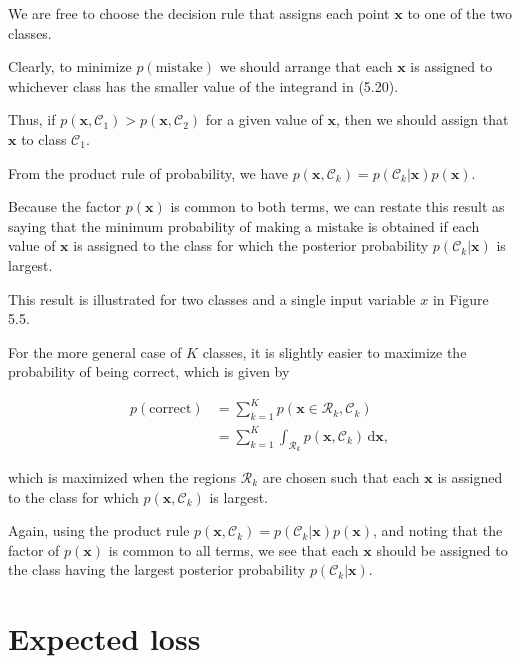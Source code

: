 \documentclass{article}
\begin{document}
We are free to choose the decision rule that assigns each point $\mathbf{x}$ to one of the two classes. 

Clearly, to minimize $p(\text{mistake})$ we should arrange that each $\mathbf{x}$ is assigned to whichever class has the smaller value of the integrand in (5.20). 

Thus, if $p(\mathbf{x},\mathcal{C}_{1}) > p(\mathbf{x},\mathcal{C}_{2})$ for a given value of $\mathbf{x}$, then we should assign that $\mathbf{x}$ to class $\mathcal{C}_{1}$. 

From the product rule of probability, we have $p(\mathbf{x},\mathcal{C}_{k}) = p(\mathcal{C}_{k}|\mathbf{x})p(\mathbf{x})$. 

Because the factor $p(\mathbf{x})$ is common to both terms, we can restate this result as saying that the minimum probability of making a mistake is obtained if each value of $\mathbf{x}$ is assigned to the class for which the posterior probability $p(\mathcal{C}_{k}|\mathbf{x})$ is largest. 

This result is illustrated for two classes and a single input variable $x$ in Figure 5.5.

For the more general case of $K$ classes, it is slightly easier to maximize the probability of being correct, which is given by

\begin{align}
p(\text{correct}) &= \sum_{k=1}^{K}p(\mathbf{x}\in\mathcal{R}_{k},\mathcal{C}_{k}) \\
&= \sum_{k=1}^{K}\int_{\mathcal{R}_{k}}p(\mathbf{x},\mathcal{C}_{k})\,\mathrm{d}\mathbf{x},
\tag{5.21}
\end{align}

which is maximized when the regions $\mathcal{R}_{k}$ are chosen such that each $\mathbf{x}$ is assigned to the class for which $p(\mathbf{x},\mathcal{C}_{k})$ is largest. 

Again, using the product rule $p(\mathbf{x},\mathcal{C}_{k}) = p(\mathcal{C}_{k}|\mathbf{x})p(\mathbf{x})$, and noting that the factor of $p(\mathbf{x})$ is common to all terms, we see that each $\mathbf{x}$ should be assigned to the class having the largest posterior probability $p(\mathcal{C}_{k}|\mathbf{x})$.

\section{Expected loss}
\end{document}
